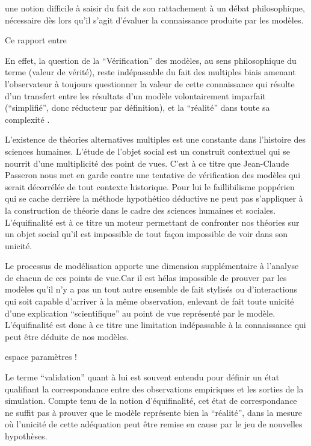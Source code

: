une notion difficile à saisir du fait de son rattachement à un débat philosophique, nécessaire dès lors qu'il s'agit d'évaluer la connaissance produite par les modèles.

Ce rapport entre  


En effet, la question de la \enquote{Vérification} des modèles, au sens philosophique du terme (valeur de vérité), reste indépassable du fait des multiples biais amenant l'observateur à toujours questionner la valeur de cette connaissance qui résulte d'un transfert entre les résultats d'un modèle volontairement imparfait (\enquote{simplifié}, donc réducteur par définition), et la \enquote{réalité} dans toute sa complexité \autocite{OSullivan2004}.


L’existence de théories alternatives multiples est une constante dans l’histoire des sciences humaines. L'étude de l'objet social est un construit contextuel qui se nourrit d'une multiplicité des point de vues. C'est à ce titre que Jean-Claude Passeron \autocite{Passeron2006} nous met en garde contre une tentative de vérification des modèles qui serait décorrélée de tout contexte historique. Pour lui le faillibilisme poppérien qui se cache derrière la méthode hypothético déductive ne peut pas s'appliquer à la construction de théorie dans le cadre des sciences humaines et sociales. L'équifinalité est à ce titre un moteur permettant de confronter nos théories sur un objet social  qu'il est impossible de tout façon impossible de voir dans son unicité. 

Le processus de modélisation apporte une dimension supplémentaire à l'analyse de chacun de ces points de vue.Car il est hélas impossible de prouver par les modèles qu'il n'y a pas un tout autre ensemble de fait stylisés ou d'interactions qui soit capable d'arriver à la même observation, enlevant de fait toute unicité d’une explication \enquote{scientifique} au point de vue représenté par le modèle. L'équifinalité est donc à ce titre une limitation indépassable à la connaissance qui peut être déduite de nos modèles.

espace paramètres !

Le terme \enquote{validation} quant à lui est souvent entendu pour définir un état qualifiant la correspondance entre des observations empiriques et les sorties de la simulation. Compte tenu de la notion d'équifinalité, cet état de correspondance ne suffit pas à prouver que le modèle représente bien la \enquote{réalité}, dans la mesure où l’unicité de cette adéquation peut être remise en cause par le jeu de nouvelles hypothèses. 

